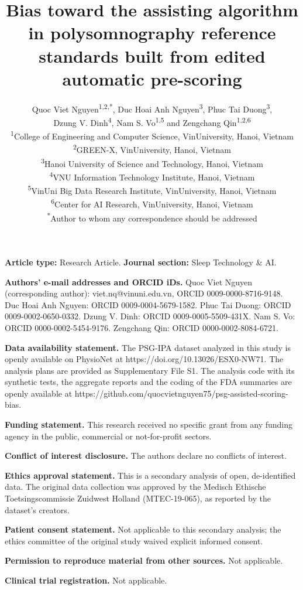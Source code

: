 \documentclass[11pt]{article}
\title{Bias toward the assisting algorithm in polysomnography reference standards built from edited automatic pre-scoring}
\author{Quoc Viet Nguyen\textsuperscript{1,2,*}, Duc Hoai Anh Nguyen\textsuperscript{3}, Phuc Tai Duong\textsuperscript{3},\\
Dzung V. Dinh\textsuperscript{4}, Nam S. Vo\textsuperscript{1,5} and Zengchang Qin\textsuperscript{1,2,6}\\[2pt]
\small\textsuperscript{1}College of Engineering and Computer Science, VinUniversity, Hanoi, Vietnam\\
\small\textsuperscript{2}GREEN-X, VinUniversity, Hanoi, Vietnam\\
\small\textsuperscript{3}Hanoi University of Science and Technology, Hanoi, Vietnam\\
\small\textsuperscript{4}VNU Information Technology Institute, Hanoi, Vietnam\\
\small\textsuperscript{5}VinUni Big Data Research Institute, VinUniversity, Hanoi, Vietnam\\
\small\textsuperscript{6}Center for AI Research, VinUniversity, Hanoi, Vietnam\\
\small\textsuperscript{*}Author to whom any correspondence should be addressed}
\date{}
\begin{document}
\maketitle
\footnotesize\sloppy

\noindent\textbf{Article type:} Research Article. \textbf{Journal section:} Sleep Technology \& AI.

\smallskip\noindent\textbf{Authors' e-mail addresses and ORCID iDs.} Quoc Viet Nguyen (corresponding author):
viet.nq@vinuni.edu.vn, ORCID 0009-0000-8716-9148. Duc Hoai Anh Nguyen: ORCID
0009-0004-5679-1582. Phuc Tai Duong: ORCID 0009-0002-0650-0332. Dzung V. Dinh: ORCID 0009-0005-5509-431X. Nam S. Vo: ORCID 0000-0002-5454-9176.
Zengchang Qin: ORCID 0000-0002-8084-6721.

\smallskip\noindent\textbf{Data availability statement.} The PSG-IPA dataset analyzed in this study is openly
available on PhysioNet at https://doi.org/10.13026/ESX0-NW71. The analysis plans are provided as Supplementary File S1.
The analysis code with its synthetic tests, the aggregate reports and the coding of the FDA summaries are openly
available at https://github.com/quocvietnguyen75/psg-assisted-scoring-bias.

\smallskip\noindent\textbf{Funding statement.} This research received no specific grant from any funding agency in
the public, commercial or not-for-profit sectors.

\smallskip\noindent\textbf{Conflict of interest disclosure.} The authors declare no conflicts of interest.

\smallskip\noindent\textbf{Ethics approval statement.} This is a secondary analysis of open, de-identified data. The
original data collection was approved by the Medisch Ethische Toetsingscommissie Zuidwest Holland (MTEC-19-065), as
reported by the dataset's creators.

\smallskip\noindent\textbf{Patient consent statement.} Not applicable to this secondary analysis; the ethics committee
of the original study waived explicit informed consent.

\smallskip\noindent\textbf{Permission to reproduce material from other sources.} Not applicable.

\smallskip\noindent\textbf{Clinical trial registration.} Not applicable.
\end{document}
